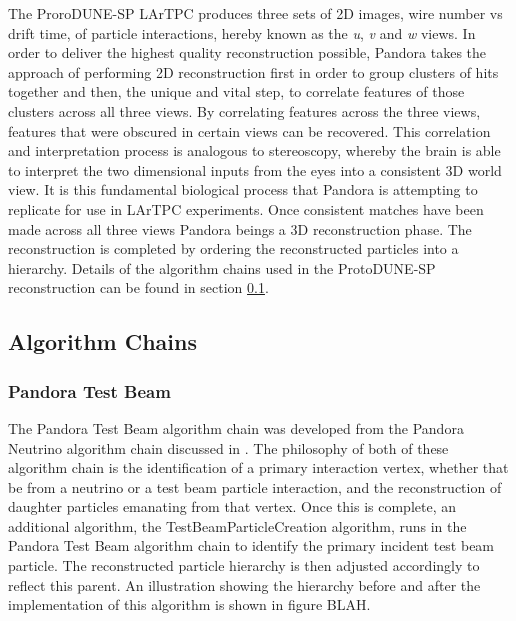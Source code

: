 The ProroDUNE-SP LArTPC produces three sets of 2D images, wire number vs drift time, of particle interactions, hereby known as the \textit{u}, \textit{v} and \textit{w} views.  In order to deliver the highest quality reconstruction possible, Pandora takes the approach of performing 2D reconstruction first in order to group clusters of hits together and then, the unique and vital step, to correlate features of those clusters across all three views.  By correlating features across the three views, features that were obscured in certain views can be recovered.  This correlation and interpretation process is analogous to stereoscopy, whereby the brain is able to interpret the two dimensional inputs from the eyes into a consistent 3D world view.  It is this fundamental biological process that Pandora is attempting to replicate for use in LArTPC experiments.  Once consistent matches have been made across all three views Pandora beings a 3D reconstruction phase.  The reconstruction is completed by ordering the reconstructed particles into a hierarchy. Details of the algorithm chains used in the ProtoDUNE-SP reconstruction can be found in section \ref{sec:algchains}.

\subsection{Algorithm Chains}
\label{sec:algchains}
\subsubsection{Pandora Test Beam}

The Pandora Test Beam algorithm chain was developed from the Pandora Neutrino algorithm chain discussed in \cite{pandorauboone}.  The philosophy of both of these algorithm chain is the identification of a primary interaction vertex, whether that be from a neutrino or a test beam particle interaction, and the reconstruction of daughter particles emanating from that vertex.  Once this is complete, an additional algorithm, the TestBeamParticleCreation algorithm, runs in the Pandora Test Beam algorithm chain to identify the primary incident test beam particle.  The reconstructed particle hierarchy is then adjusted accordingly to reflect this parent.  An illustration showing the hierarchy before and after the implementation of this algorithm is shown in figure BLAH.


